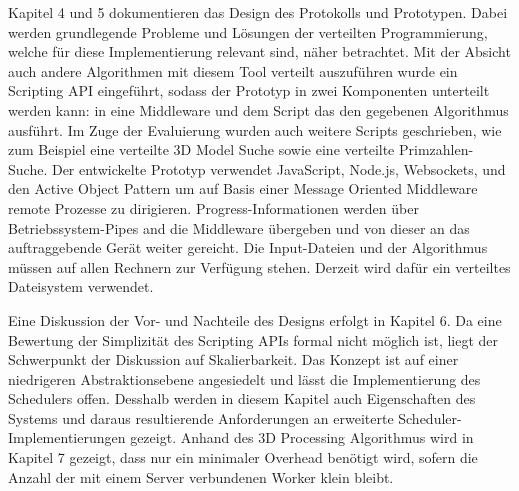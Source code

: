 Kapitel 4 und 5 dokumentieren das Design des Protokolls und Prototypen.
Dabei werden grundlegende Probleme und Lösungen der verteilten Programmierung, welche für diese Implementierung relevant sind, näher betrachtet.
Mit der Absicht auch andere Algorithmen mit diesem Tool verteilt auszuführen wurde ein Scripting API eingeführt, sodass der Prototyp in zwei Komponenten unterteilt werden kann:
in eine Middleware und dem Script das den gegebenen Algorithmus ausführt.
Im Zuge der Evaluierung wurden auch weitere Scripts geschrieben, wie zum Beispiel eine verteilte 3D Model Suche sowie eine verteilte Primzahlen-Suche.
Der entwickelte Prototyp verwendet JavaScript, Node.js, Websockets, und den Active Object Pattern um auf Basis einer Message Oriented Middleware remote Prozesse zu dirigieren.
Progress-Informationen werden über Betriebssystem-Pipes and die Middleware übergeben und von dieser an das auftraggebende Gerät weiter gereicht.
Die Input-Dateien und der Algorithmus müssen auf allen Rechnern zur Verfügung stehen.
Derzeit wird dafür ein verteiltes Dateisystem verwendet.

Eine Diskussion der Vor- und Nachteile des Designs erfolgt in Kapitel 6.
Da eine Bewertung der Simplizität des Scripting APIs formal nicht möglich ist, liegt der Schwerpunkt der Diskussion auf Skalierbarkeit.
Das Konzept ist auf einer niedrigeren Abstraktionsebene angesiedelt und lässt die Implementierung des Schedulers offen.
Desshalb werden in diesem Kapitel auch Eigenschaften des Systems und daraus resultierende Anforderungen an erweiterte Scheduler-Implementierungen gezeigt.
Anhand des 3D Processing Algorithmus wird in Kapitel 7 gezeigt, dass nur ein minimaler Overhead benötigt wird, sofern die Anzahl der mit einem Server verbundenen Worker klein bleibt.
